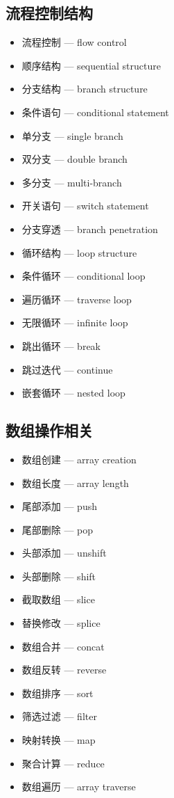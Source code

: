 \subsection{流程控制结构}
\begin{itemize}
\item 流程控制 — flow control
\item 顺序结构 — sequential structure
\item 分支结构 — branch structure
\item 条件语句 — conditional statement
\item 单分支 — single branch
\item 双分支 — double branch
\item 多分支 — multi-branch
\item 开关语句 — switch statement
\item 分支穿透 — branch penetration
\item 循环结构 — loop structure
\item 条件循环 — conditional loop
\item 遍历循环 — traverse loop
\item 无限循环 — infinite loop
\item 跳出循环 — break
\item 跳过迭代 — continue
\item 嵌套循环 — nested loop
\end{itemize}

\subsection{数组操作相关}
\begin{itemize}
\item 数组创建 — array creation
\item 数组长度 — array length
\item 尾部添加 — push
\item 尾部删除 — pop
\item 头部添加 — unshift
\item 头部删除 — shift
\item 截取数组 — slice
\item 替换修改 — splice
\item 数组合并 — concat
\item 数组反转 — reverse
\item 数组排序 — sort
\item 筛选过滤 — filter
\item 映射转换 — map
\item 聚合计算 — reduce
\item 数组遍历 — array traverse
\end{itemize}

